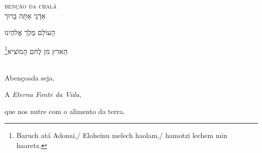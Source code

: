 \textsc{benção da chalá}\\[15pt]

אַדָנָי אַתָּה בָּרוּך

הָעוֹלָם מֶלֶך אֱלהֵינוּ 

הַארץ מן לֶחם הָמוֹציא\footnote{Baruch atá Adonai,/ Eloheinu melech haolam,/ hamotzi lechem min haaretz.}

\movetooddpage
\raggedright

\textsc{}\\[15pt]

Abençoada seja,

A \emph{Eterna Fonte da Vida}, 

que nos nutre com o alimento da terra.
